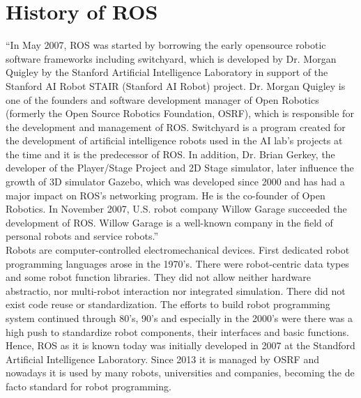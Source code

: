 \section{History of ROS}
“In May 2007, ROS was started by borrowing the early opensource robotic software frameworks including switchyard, which is developed by Dr. Morgan Quigley by the Stanford Artificial Intelligence Laboratory in support of the Stanford AI Robot STAIR (Stanford AI Robot) project.
Dr. Morgan Quigley is one of the founders and software development manager of Open Robotics (formerly the Open Source Robotics Foundation, OSRF), which is responsible for the development and management of ROS.
Switchyard is a program created for the development of artificial intelligence robots used in the AI lab’s projects at the time and it is the predecessor of ROS.
In addition, Dr. Brian Gerkey, the developer of the Player/Stage Project and 2D Stage simulator, later influence the growth of 3D simulator Gazebo, which was developed since 2000 and has had a major impact on ROS’s networking program. He is the co-founder of Open Robotics.
In November 2007, U.S. robot company Willow Garage succeeded the development of ROS. Willow Garage is a well-known company in the field of personal robots and service robots.” \cite{Quigley15}\\
Robots are computer-controlled electromechanical devices.
First dedicated robot programming languages arose in the 1970's.
There were robot-centric data types and some robot function libraries. They did not allow neither hardware abstractio, nor multi-robot interaction nor integrated simulation. There did not exist code reuse or standardization.
The efforts to build robot programming system continued through 80's, 90's and especially in the 2000's were there was a high push to standardize robot components, their interfaces and basic functions.\\
Hence, ROS as it is known today was initially developed in 2007 at the Standford Artificial Intelligence Laboratory. Since 2013 it is managed by OSRF and nowadays it is used by many robots, universities and companies, becoming the de facto standard for robot programming.
\newpage
